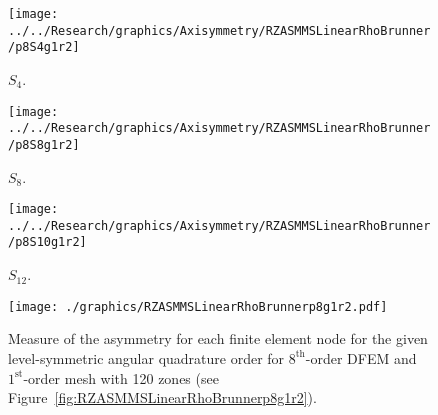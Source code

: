 \documentclass[12pt]{article}
\begin{document}
\begin{sidewaysfigure}[!htb]
\centering
\begin{subfigure}{0.33\textwidth}
\texttt{[image: ../../Research/graphics/Axisymmetry/RZASMMSLinearRhoBrunner/p8S4g1r2]}
\caption{$S_4$.}
\end{subfigure}%
\begin{subfigure}{0.33\textwidth}
\texttt{[image: ../../Research/graphics/Axisymmetry/RZASMMSLinearRhoBrunner/p8S8g1r2]}
\caption{$S_8$.}
\end{subfigure}%
\begin{subfigure}{0.33\textwidth}
\texttt{[image: ../../Research/graphics/Axisymmetry/RZASMMSLinearRhoBrunner/p8S10g1r2]}
\caption{$S_{12}$.}
\end{subfigure}
\caption{Relative asymmetry for $8^\text{st}$-order finite elements on a $1^\text{st}$-order mesh for given order of level-symmetric angular quadrature.}
\label{fig:RZASMMSLinearRhoBrunnerp8g1r2}
\end{sidewaysfigure}

\begin{figure}[!htb]
\centering
\texttt{[image: ./graphics/RZASMMSLinearRhoBrunnerp8g1r2.pdf]}
\caption{Measure of the asymmetry for each finite element node for the given level-symmetric angular quadrature order for $8^\text{th}$-order DFEM and $1^\text{st}$-order mesh with 120 zones (see Figure~\ref{fig:RZASMMSLinearRhoBrunnerp8g1r2}).}
\label{fig:RZASMMSLinearRhoBrunnerp8g1r2Nodes}
\end{figure}
\end{document}
